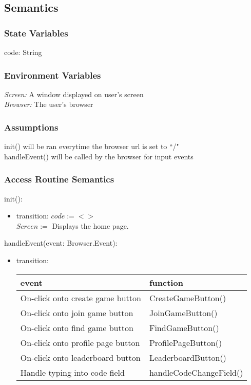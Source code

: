 \documentclass[12pt, titlepage]{article}
\begin{document}
\subsection{Semantics}
\subsubsection{State Variables}

code: String

\subsubsection{Environment Variables}
\textit{Screen: } A window displayed on user's screen\\
\textit{Browser: } The user's browser

\subsubsection{Assumptions}

init() will be ran everytime the browser url is set to ``/"\\
handleEvent() will be called by the browser for input events

\subsubsection{Access Routine Semantics}
\noindent init():
\begin{itemize}
\item transition:
$code := <>$ \\
$Screen :=$ Displays the home page. 
\end{itemize}


\noindent handleEvent(event: Browser.Event):
\begin{itemize}
\item transition: \begin{tabular}{p{5cm} p{4cm}}
\hline
\textbf{event} & \textbf{function} \\
\hline
On-click onto create game button & CreateGameButton() \\
On-click onto join game button & JoinGameButton() \\
On-click onto find game button & FindGameButton() \\
On-click onto profile page button & ProfilePageButton() \\
On-click onto leaderboard button & LeaderboardButton() \\
Handle typing into code field  & handleCodeChangeField() \\
\hline
\end{tabular}
\end{itemize}
\end{document}
